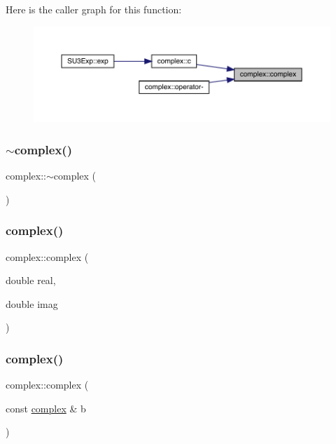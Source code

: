 Here is the caller graph for this function\+:
\nopagebreak
\begin{figure}[H]
\begin{center}
\leavevmode
\includegraphics[width=350pt]{classcomplex_a1fb8d3affbc54c1ad34a0820b357e194_icgraph}
\end{center}
\end{figure}
\mbox{\label{classcomplex_abd31d1c53fe873fa4ec0fbce50601485}} 
\subsubsection{\texorpdfstring{$\sim$complex()}{~complex()}}
{\footnotesize\ttfamily complex\+::$\sim$complex (\begin{DoxyParamCaption}{ }\end{DoxyParamCaption})}

\mbox{\label{classcomplex_ab8d6f234864954c1ab460984a1e32bd3}} 
\subsubsection{\texorpdfstring{complex()}{complex()}\hspace{0.1cm}{\footnotesize\ttfamily [2/3]}}
{\footnotesize\ttfamily complex\+::complex (\begin{DoxyParamCaption}\item[{double}]{real,  }\item[{double}]{imag }\end{DoxyParamCaption})}

\mbox{\label{classcomplex_a57fa59491a94c3aeeb5b005fed5d0ed4}} 
\subsubsection{\texorpdfstring{complex()}{complex()}\hspace{0.1cm}{\footnotesize\ttfamily [3/3]}}
{\footnotesize\ttfamily complex\+::complex (\begin{DoxyParamCaption}\item[{const \mbox{\hyperlink{classcomplex}{complex}} \&}]{b }\end{DoxyParamCaption})}

